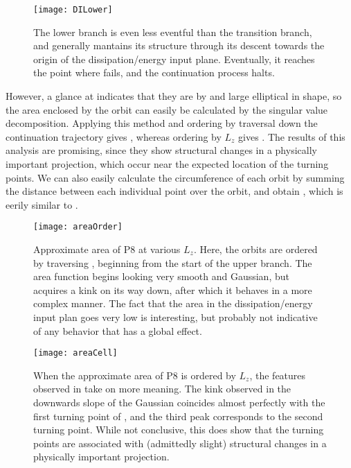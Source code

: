 \begin{figure}[h]
\texttt{[image: DILower]}
\caption{The lower branch is even less eventful than the transition branch, and generally mantains its structure through its descent towards the origin of the dissipation/energy input plane. Eventually, it reaches the point where  fails, and the continuation process halts.}\label{fig:DILower}
\end{figure}

However, a glance at  indicates that they are by and large elliptical in shape, so the area enclosed by the orbit can easily be calculated by the singular value decomposition. Applying this method and ordering by traversal down the continuation trajectory gives , whereas ordering by $L_z$ gives . The results of this analysis are promising, since they show structural changes in a physically important projection, which occur near the expected location of the turning points. We can also easily calculate the circumference of each orbit by summing the distance between each individual point over the orbit, and obtain , which is eerily similar to . \\

\begin{figure}[h!]
\texttt{[image: areaOrder]}
\caption{Approximate area of P8 at various $L_z$. Here, the orbits are ordered by traversing , beginning from the start of the upper branch. The area function begins looking very smooth and Gaussian, but acquires a kink on its way down, after which it behaves in a more complex manner. The fact that the area in the dissipation/energy input plan goes very low is interesting, but probably not indicative of any behavior that has a global effect.}\label{fig:areaOrder}
\end{figure}

\begin{figure}[h!]
\texttt{[image: areaCell]}
\caption{When the approximate area of P8 is ordered by $L_z$, the features observed in  take on more meaning. The kink observed in the downwards slope of the Gaussian coincides almost perfectly with the first turning point of , and the third peak corresponds to the second turning point. While not conclusive, this does show that the turning points are associated with (admittedly slight) structural changes in a physically important projection. }\label{fig:areaCell}
\end{figure}

